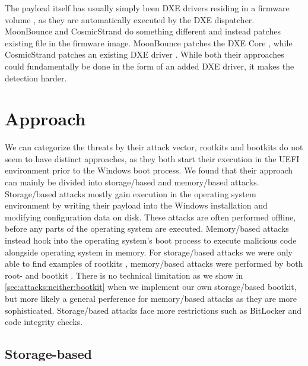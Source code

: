 The payload itself has usually simply been \ac{DXE} drivers residing in a firmware volume \cite{mosaicregressor-technical-details,lojax}, as they are automatically executed by the \ac{DXE} dispatcher.
MoonBounce and CosmicStrand do something different and instead patches existing file in the firmware image.
MoonBounce patches the \ac{DXE} Core \cite{moonbounce}, while CosmicStrand patches an existing \ac{DXE} driver \cite{cosmicstrand}.
While both their approaches could fundamentally be done in the form of an added \ac{DXE} driver, it makes the detection harder.

\section{Approach}

We can categorize the threats by their attack vector, rootkits and bootkits do not seem to have distinct approaches, as they both start their execution in the \ac{UEFI} environment prior to the Windows boot process.
We found that their approach can mainly be divided into storage\-/based and memory\-/based attacks.
Storage\-/based attacks mostly gain execution in the operating system environment by writing their payload into the Windows installation and modifying configuration data on disk.
These attacks are often performed offline, before any parts of the operating system are executed.
Memory\-/based attacks instead hook into the operating system's boot process to execute malicious code alongside operating system in memory.
For storage\-/based attacks we were only able to find examples of rootkits \cite{vector-edk,mosaicregressor-technical-details,lojax}, memory\-/based attacks were performed by both root- and bootkit \cite{dreamboot,efiguard,especter,finspy,moonbounce,cosmicstrand}.
There is no technical limitation as we show in \autoref{sec:attacks:neither:bootkit} when we implement our own storage\-/based bootkit, but more likely a general perference for memory\-/based attacks as they are more sophisticated.
Storage\-/based attacks face more restrictions such as BitLocker and code integrity checks.

\subsection{Storage-based}

